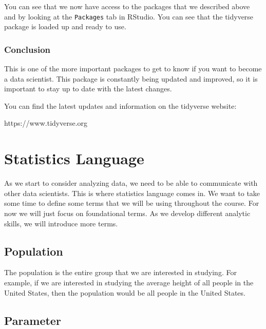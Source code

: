 \documentclass[
  letterpaper,
  DIV=11,
  numbers=noendperiod]{scrreprt}
\begin{document}
You can see that we now have access to the packages that we described
above and by looking at the \texttt{Packages} tab in RStudio. You can
see that the tidyverse package is loaded up and ready to use.

\subsection*{Conclusion}\label{conclusion}

This is one of the more important packages to get to know if you want to
become a data scientist. This package is constantly being updated and
improved, so it is important to stay up to date with the latest changes.

You can find the latest updates and information on the tidyverse
website:

https://www.tidyverse.org


\chapter*{Statistics Language}\label{statistics-language}


As we start to consider analyzing data, we need to be able to
communicate with other data scientists. This is where statistics
language comes in. We want to take some time to define some terms that
we will be using throughout the course. For now we will just focus on
foundational terms. As we develop different analytic skills, we will
introduce more terms.

\section*{Population}\label{population}


The population is the entire group that we are interested in studying.
For example, if we are interested in studying the average height of all
people in the United States, then the population would be all people in
the United States.

\section*{Parameter}\label{parameter}
\end{document}
